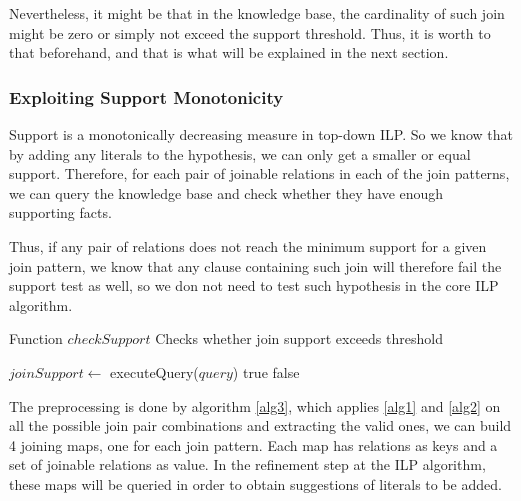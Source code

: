 Nevertheless, it might be that in the knowledge base, the cardinality of such join might be zero or simply not exceed
the support threshold. Thus, it is worth to that beforehand, and that is what will be explained in the next section.

\subsubsection{Exploiting Support Monotonicity}

Support is a monotonically decreasing measure in top-down ILP. So we know that by adding any
literals to the hypothesis, we can only get a smaller or equal support. Therefore, for each pair of joinable relations
in each of the join patterns, we can query the knowledge base and check whether they have enough supporting facts.

Thus, if any pair of relations does not reach the minimum support for a given join pattern, we know that any clause
containing such join will therefore fail the support test as well, so we don not need to test such hypothesis in the
core
ILP algorithm.

\begin{algorithm}[!h]
  \caption{Function $checkSupport$ \newline Checks whether join support exceeds threshold}
  \label{alg2}
     {
    }
    $joinSupport \leftarrow$ executeQuery($query$)\;
      {
      \Return true\;
    }{
      \Return false\;
    }
\end{algorithm}


The preprocessing is done by algorithm \ref{alg3}, which applies \ref{alg1} and \ref{alg2} on all the possible join pair
combinations and extracting the valid ones, we can build 4 joining maps, one for each join pattern. Each map has
relations as keys and a set of joinable relations as value. In the refinement step at the ILP algorithm, these maps will
be queried in order to obtain suggestions of literals to be
added.

